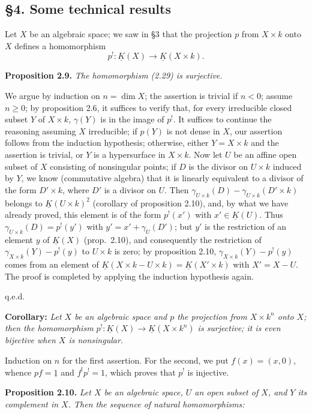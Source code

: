 \subsection*{\S 4. Some technical results}

Let $X$ be an algebraic space; we saw in \S 3 that the projection $p$ from $X\times k$ onto $X$ defines a homomorphism
\begin{equation}\tag{2.29}
 p^!:\underline K(X)\longrightarrow\underline K(X\times k).
\end{equation}

\textbf{Proposition 2.9.} \emph{The homomorphism (2.29) is surjective.}

We argue by induction on $n=\dim X$; the assertion is trivial if $n<0$; assume $n\geq0$; by proposition 2.6, it suffices to
%
verify that, for every irreducible closed subset $Y$ of $X\times k$, $\gamma(Y)$ is in the image of $p^!$. It suffices to continue the reasoning assuming $X$ irreducible; if $p(Y)$ is not dense in $X$, our assertion follows from the induction hypothesis; otherwise, either $Y=X\times k$ and the assertion is trivial, or $Y$ is a hypersurface in $X\times k$. Now let $U$ be an affine open subset of $X$ consisting of nonsingular points; if $D$ is the divisor on $U\times k$ induced by $Y$, we know (commutative algebra) that it is linearly equivalent to a divisor of the form $D'\times k$, where $D'$ is a divisor on $U$. Then $\gamma_{U\times k}(D)-\gamma_{U\times k}(D'\times k)$ belongs to $\underline K(U\times k)^2$ (corollary of proposition 2.10), and, by what we have already proved, this element is of the form $p^!(x')$ with $x'\in\underline K(U)$. Thus $\gamma_{U\times k}(D)=p^!(y')$ with $y'=x'+\gamma_U(D')$; but $y'$ is the restriction of an element $y$ of $\underline K(X)$ (prop.\ 2.10), and consequently the restriction of $\gamma_{X\times k}(Y)-p^!(y)$ to $U\times k$ is zero; by proposition 2.10, $\gamma_{X\times k}(Y)-p^!(y)$ comes from an element of $\underline K(X\times k-U\times k)=\underline K(X'\times k)$ with $X'=X-U$. The proof is completed by applying the induction hypothesis again.
\begin{flushright}q.e.d.\end{flushright}

\textbf{Corollary:} \emph{Let $X$ be an algebraic space and $p$ the projection from $X\times k^n$ onto $X$; then the homomorphism $p^!:\underline K(X)\longrightarrow\underline K(X\times k^n)$ is surjective; it is even bijective when $X$ is nonsingular.}

Induction on $n$ for the first assertion. For the second, we put $f(x)=(x,0)$, whence $pf=\underline{1}$ and $f^!p^!=1$, which proves that $p^!$ is injective.

\textbf{Proposition 2.10.} \emph{Let $X$ be an algebraic space, $U$ an open subset of $X$, and $Y$ its complement in $X$. Then the sequence of natural homomorphisms:}
